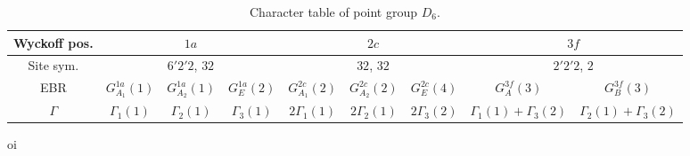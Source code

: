 \begin{table}[H]
\footnotesize
\caption{Character table of point group $D_6$.}
\centering
\begin{tabular}{|c|c|c|c|c|c|c|c|c|}
\hline
Wyckoff pos. & \multicolumn{3}{c|}{$1a$} & \multicolumn{3}{c|}{$2c$} & \multicolumn{2}{c|}{$3f$} \\
\hline
Site sym. & \multicolumn{3}{c|}{$6'2'2$, $32$} & \multicolumn{3}{c|}{$32$, $32$} & \multicolumn{2}{c|}{$2'2'2$, $2$} \\
\hline
EBR      & $G_{A_1}^{1a}(1)$ & $G_{A_2}^{1a}(1)$ & $G_{E}^{1a}(2)$ & $G_{A_1}^{2c}(2)$ & $G_{A_2}^{2c}(2)$ & $G_{E}^{2c}(4)$   & $G_{A}^{3f}(3)$ & $G_{B}^{3f}(3)$ \\
\hline
$\Gamma$ & $\Gamma_1(1)$ & $\Gamma_2(1)$ & $\Gamma_3(1)$ & $2\Gamma_1(1)$ & $2\Gamma_2(1)$ & $2\Gamma_3(2)$ & $\Gamma_1(1)+\Gamma_3(2)$ & $\Gamma_2(1)+\Gamma_3(2)$ \\
\hline
\end{tabular}
\label{tab:matbg-irreps}
\end{table}

oi



%



